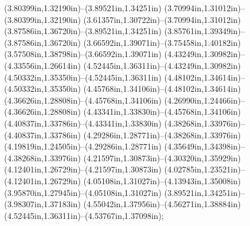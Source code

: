 (3.80399in,1.32190in)--(3.89521in,1.34251in) (3.70994in,1.31012in)--(3.80399in,1.32190in) (3.61357in,1.30722in)--(3.70994in,1.31012in) (3.87586in,1.36720in)--(3.89521in,1.34251in) (3.85761in,1.39349in)--(3.87586in,1.36720in) (3.66592in,1.39071in)--(3.75458in,1.40182in) (3.57508in,1.38798in)--(3.66592in,1.39071in) (4.43249in,1.30982in)--(4.33556in,1.26614in) (4.52445in,1.36311in)--(4.43249in,1.30982in) (4.50332in,1.35350in)--(4.52445in,1.36311in) (4.48102in,1.34614in)--(4.50332in,1.35350in) (4.45768in,1.34106in)--(4.48102in,1.34614in) (4.36626in,1.28808in)--(4.45768in,1.34106in) (4.26990in,1.24466in)--(4.36626in,1.28808in) (4.43341in,1.33830in)--(4.45768in,1.34106in) (4.40837in,1.33786in)--(4.43341in,1.33830in) (4.38268in,1.33976in)--(4.40837in,1.33786in) (4.29286in,1.28771in)--(4.38268in,1.33976in) (4.19819in,1.24505in)--(4.29286in,1.28771in) (4.35649in,1.34398in)--(4.38268in,1.33976in) (4.21597in,1.30873in)--(4.30320in,1.35929in) (4.12401in,1.26729in)--(4.21597in,1.30873in) (4.02785in,1.23521in)--(4.12401in,1.26729in) (4.05108in,1.31027in)--(4.13943in,1.35008in) (3.95870in,1.27945in)--(4.05108in,1.31027in) (3.89521in,1.34251in)--(3.98307in,1.37183in) (4.55042in,1.37956in)--(4.56271in,1.38884in) (4.52445in,1.36311in)--(4.53767in,1.37098in);
